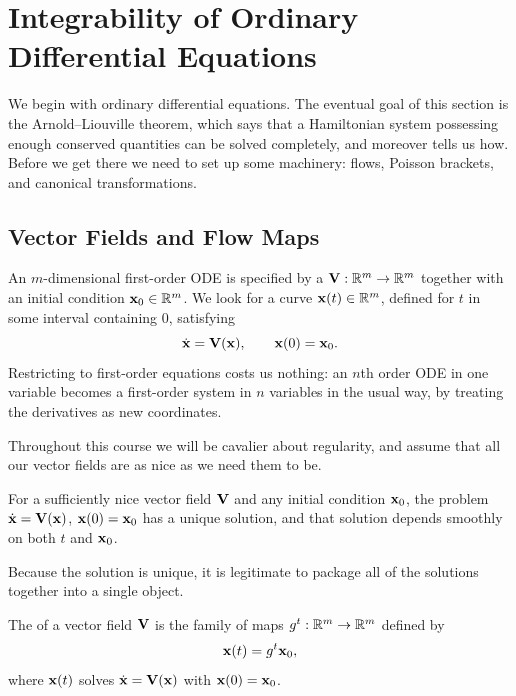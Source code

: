 \documentclass[a4paper]{scrartcl}
\begin{document}
\tableofcontents

\section{Integrability of Ordinary Differential Equations}

We begin with ordinary differential equations. The eventual goal of this section is the Arnold--Liouville theorem, which says that a Hamiltonian system possessing enough conserved quantities can be solved completely, and moreover tells us how. Before we get there we need to set up some machinery: flows, Poisson brackets, and canonical transformations.

\subsection{Vector Fields and Flow Maps}

An $m$-dimensional first-order ODE is specified by a  $\mathbf{V} : \mathbb{R}^m \to \mathbb{R}^m$ together with an initial condition $\mathbf{x}_0 \in \mathbb{R}^m$. We look for a curve $\mathbf{x}(t) \in \mathbb{R}^m$, defined for $t$ in some interval containing $0$, satisfying
$$
\dot{\mathbf{x}} = \mathbf{V}(\mathbf{x}), \qquad \mathbf{x}(0) = \mathbf{x}_0.
$$
Restricting to first-order equations costs us nothing: an $n$th order ODE in one variable becomes a first-order system in $n$ variables in the usual way, by treating the derivatives as new coordinates.

Throughout this course we will be cavalier about regularity, and assume that all our vector fields are as nice as we need them to be.

\begin{fact}
	For a sufficiently nice vector field $\mathbf{V}$ and any initial condition $\mathbf{x}_0$, the problem $\dot{\mathbf{x}} = \mathbf{V}(\mathbf{x})$, $\mathbf{x}(0) = \mathbf{x}_0$ has a unique solution, and that solution depends smoothly on both $t$ and $\mathbf{x}_0$.
\end{fact}

Because the solution is unique, it is legitimate to package all of the solutions together into a single object.

\begin{definition}
	The  of a vector field $\mathbf{V}$ is the family of maps $g^t : \mathbb{R}^m \to \mathbb{R}^m$ defined by
	$$
	\mathbf{x}(t) = g^t \mathbf{x}_0,
	$$
	where $\mathbf{x}(t)$ solves $\dot{\mathbf{x}} = \mathbf{V}(\mathbf{x})$ with $\mathbf{x}(0) = \mathbf{x}_0$.
\end{definition}
\end{document}

